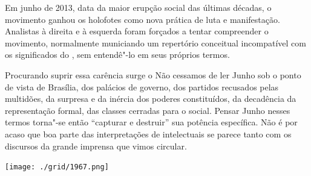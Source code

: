 \hspace*{-7cm}\hrulefill\hspace*{-7cm}

\medskip

\noindent{}Em junho de 2013, data da maior erupção social das últimas décadas, o movimento {} ganhou os holofotes como nova prática de luta e manifestação. Analistas à direita e à esquerda foram forçados a tentar compreender o movimento, normalmente municiando um repertório conceitual incompatível com os significados do {}, sem entendê"-lo em seus próprios termos.

Procurando suprir essa carência surge o  Não cessamos de ler Junho sob o ponto de vista de Brasília, dos palácios de governo, dos partidos recusados pelas multidões, da surpresa e da inércia dos poderes constituídos, da decadência da representação formal, das classes cerradas para o social. Pensar Junho nesses termos torna"-se então “capturar e destruir” sua potência específica. Não é por acaso que boa parte das interpretações de intelectuais se parece tanto com os discursos da grande imprensa que vimos circular.


\vfill

\hspace*{-.4cm}\begin{minipage}[c]{.5\linewidth}
\small{
{}}
\end{minipage}


\pagebreak %


\begin{center}
\hspace*{.5cm}\texttt{[image: ./grid/1967.png]}
\end{center}

\hspace*{-7cm}\hrulefill\hspace*{-7cm}

